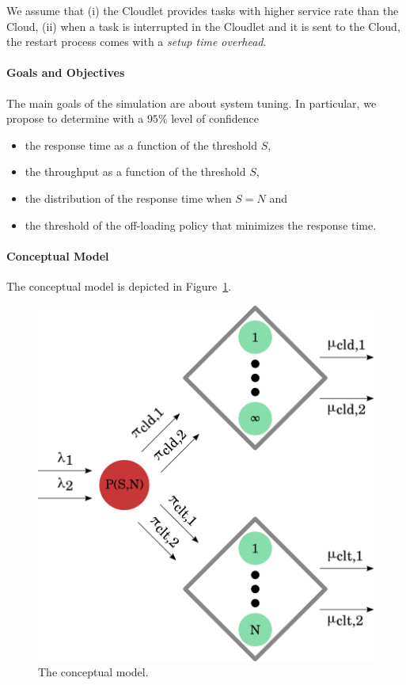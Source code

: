 We assume that
(i) the Cloudlet provides tasks with higher service rate than the Cloud, 
(ii) when a task is interrupted in the Cloudlet and it is sent to the Cloud, the restart process comes with a \textit{setup time overhead}.

\paragraph{Goals and Objectives}
The main goals of the simulation are about system tuning.
In particular, we propose to determine with a $95\%$ level of confidence
\begin{itemize}
	\item the response time as a function of the threshold $S$,
	\item the throughput as a function of the threshold $S$,
	\item the distribution of the response time when $S=N$ and
	\item the threshold of the off-loading policy that minimizes the response time.
\end{itemize}


\paragraph{Conceptual Model}
The conceptual model is depicted in Figure~\ref{fig:modeling-conceptual-model}.

\begin{figure}
	\includegraphics[width=\columnwidth]{fig/modeling-conceptual-model}
	\caption{The conceptual model.}
	\label{fig:modeling-conceptual-model}
\end{figure}

